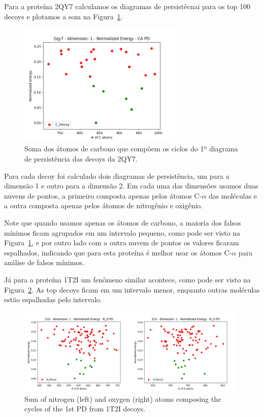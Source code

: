 Para a proteína 2QY7 calculamos os diagramas de persistêcnai para os top 100 decoys e plotamos a
som na Figura~\ref{fig:cyc2qy7}.

\begin{figure}[!htbp]
    \centering
    \includegraphics[width=0.7\textwidth]{images/relatorio/cyc2qy7.png}
    \caption{Soma dos átomos de carbono que compõem os ciclos do
            1º diagrama de persistência das decoys da 2QY7.}
    \label{fig:cyc2qy7}
    \fautor
\end{figure}

Para cada decoy foi calculado dois diagramas de persistência, um para a dimensão 1 e outro para a dimensão 2.
Em cada uma das dimensões usamos duas nuvens de pontos, a primeiro composta apenas pelos átomos C-$\alpha$
das moléculas e a outra composta apenas pelos átomos de nitrogênio e oxigênio.

Note que quando usamos apenas os átomos de carbono, a maioria dos falsos mínimos ficam agrupados em um intervalo
pequeno, como pode ser visto na Figura~\ref{fig:cyc2qy7}, e por outro lado com a outra nuvem de pontos os valores
ficaram espalhados, indicando que para esta proteína é melhor usar os átomos C-$\alpha$ para análise de falsos
mínimos.

Já para a proteína 1T2I um fenômeno similar acontece, como pode ser visto na Figura~\ref{fig:nocyc}. As top decoys
ficam em um intervalo menor, enquanto outras moléculas estão espalhadas pelo intervalo.
\begin{figure}[!htbp]
    \centering
    \includegraphics[width=0.99\textwidth]{images/relatorio/NOcyc.png}
    \caption{Sum of nitrogen (left) and oxygen (right) atoms composing the cycles of the 1st PD from 1T2I decoys.}
    \label{fig:nocyc}
    \fautor
\end{figure}

